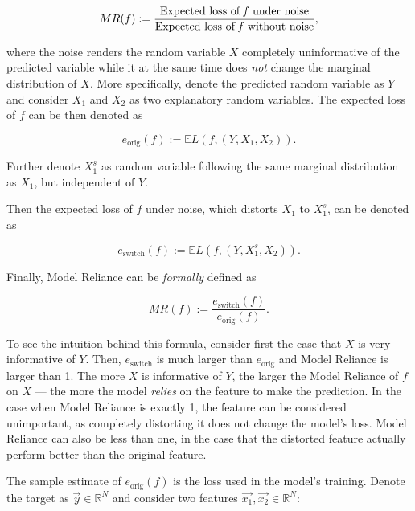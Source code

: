 			\begin{equation*}
				MR(f):=\frac{\text{Expected loss of \textit{f} under noise}}{\text{Expected loss of \textit{f} without noise}},
			\end{equation*}
			
			where the noise renders the random variable $X$ completely uninformative of the predicted variable while it at the same time does \textit{not} change the marginal distribution of $X$. More specifically, denote the predicted random variable as $Y$ and consider $X_1$ and $X_2$ as two explanatory random variables. The expected loss of $f$ can be then denoted as 
			
			\begin{equation*}
				e_{\text{orig}}(f):= \mathbb{E} L(f,(Y,X_1, X_2)).
			\end{equation*} 
			
			Further denote $X_1^s$ as random variable following the same marginal distribution as $X_1$, but independent of $Y$. 
			
			Then the expected loss of $f$ under noise, which distorts $X_1$ to $X_1^s$, can be denoted as 
			
			\begin{equation*}
				e_{\text{switch}}(f):= \mathbb{E} L(f,(Y,X_1^s, X_2)).
			\end{equation*} 
			
			Finally, Model Reliance can be \textit{formally} defined as 
			
			\begin{equation*}
				MR(f):=\frac{e_{\text{switch}}(f)}{e_{\text{orig}}(f)}.
			\end{equation*}
			
			To see the intuition behind this formula, consider first the case that $X$ is very informative of $Y$. Then, 	$e_{\text{switch}}$ is much larger than $e_{\text{orig}}$ and Model Reliance is larger than 1. The more $X$ is informative of $Y$, the larger the  Model Reliance of $f$ on $X$ --- the more the model \textit{relies} on the feature to make the prediction. In the case when Model Reliance is exactly 1, the feature can be considered unimportant, as completely distorting it does not change the model's loss. Model Reliance can also be less than one, in the case that the distorted feature actually perform better than the original feature.
					
			The sample estimate of $e_{\text{orig}}(f)$ is the loss used in the model's training. Denote the target as $\vec{y} \in \mathbb{R}^N$ and consider two features $\vec{x_1}, \vec{x_2} \in \mathbb{R}^{N}$:
			
